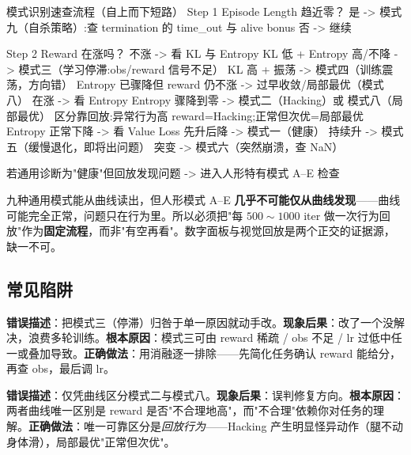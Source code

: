 \begin{codebox}[text]{模式识别速查流程（自上而下短路）}
Step 1  Episode Length 趋近零？
        是 -> 模式九（自杀策略）:查 termination 的 time_out 与 alive bonus
        否 -> 继续

Step 2  Reward 在涨吗？
        不涨 -> 看 KL 与 Entropy
                KL 低 + Entropy 高/不降 -> 模式三（学习停滞:obs/reward 信号不足）
                KL 高 + 振荡            -> 模式四（训练震荡，方向错）
                Entropy 已骤降但 reward 仍不涨 -> 过早收敛/局部最优（模式八）
        在涨 -> 看 Entropy
                Entropy 骤降到零 -> 模式二（Hacking）或 模式八（局部最优）
                                   区分靠回放:异常行为高 reward=Hacking;正常但次优=局部最优
                Entropy 正常下降 -> 看 Value Loss
                                   先升后降 -> 模式一（健康）
                                   持续升   -> 模式五（缓慢退化，即将出问题）
                                   突变     -> 模式六（突然崩溃，查 NaN）

若通用诊断为"健康"但回放发现问题 -> 进入人形特有模式 A--E 检查
\end{codebox}

\begin{insight}\label{ins:rlmc-diag-replay}
九种通用模式能从曲线读出，但人形模式 A--E \textbf{几乎不可能仅从曲线发现}——曲线可能完全正常，问题只在行为里。所以必须把"每 $500\sim1000$ iter 做一次行为回放"作为\textbf{固定流程}，而非"有空再看"。数字面板与视觉回放是两个正交的证据源，缺一不可。
\end{insight}

\subsection{常见陷阱}

\begin{pitfall}[一个模式只有一个原因]
\textbf{错误描述}：把模式三（停滞）归咎于单一原因就动手改。\textbf{现象后果}：改了一个没解决，浪费多轮训练。\textbf{根本原因}：模式三可由 reward 稀疏 / obs 不足 / lr 过低中任一或叠加导致。\textbf{正确做法}：用消融逐一排除——先简化任务确认 reward 能给分，再查 obs，最后调 lr。
\end{pitfall}

\begin{pitfall}
\textbf{错误描述}：仅凭曲线区分模式二与模式八。\textbf{现象后果}：误判修复方向。\textbf{根本原因}：两者曲线唯一区别是 reward 是否"不合理地高"，而"不合理"依赖你对任务的理解。\textbf{正确做法}：唯一可靠区分是\emph{回放行为}——Hacking 产生明显怪异动作（腿不动身体滑），局部最优"正常但次优"。
\end{pitfall}

